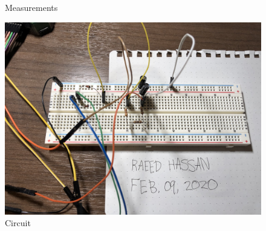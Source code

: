 \documentclass[12pt]{article}
\begin{document}
\begin{landscape}
\begin{figure}[ht!]
\begin{minipage}[b]{0.5\linewidth}
            \caption{Measurements} 
            \vspace{4ex}
        \end{minipage}%
        \begin{minipage}[b]{0.5\linewidth}
            \centering
            \includegraphics[width=0.74\linewidth]{images/Circuit.png} 
            \caption{Circuit} 
            \vspace{4ex}
        \end{minipage}%
    \end{figure}
\end{landscape}
\end{document}

